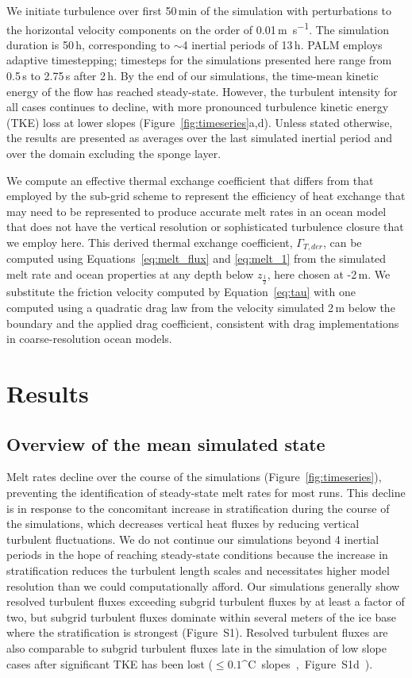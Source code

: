 \documentclass[tc, manuscript]{copernicus}
\begin{document}
We initiate turbulence over first 50\,min of the simulation with perturbations to the horizontal velocity components on the order of 0.01\,\unit{m s^{-1}}. The simulation duration is 50\,\unit{h}, corresponding to $\sim$4 inertial periods of 13\,\unit{h}. PALM employs adaptive timestepping; timesteps for the simulations presented here range from 0.5\,s to 2.75\,s after 2\,\unit{h}. By the end of our simulations, the time-mean kinetic energy of the flow has reached steady-state. However, the turbulent intensity for all cases continues to decline, with more pronounced turbulence kinetic energy (TKE) loss at lower slopes (Figure~\ref{fig:timeseries}a,d). Unless stated otherwise, the results are presented as averages over the last simulated inertial period and over the domain excluding the sponge layer.

We compute an effective thermal exchange coefficient that differs from that employed by the sub-grid scheme to represent the efficiency of heat exchange that may need to be represented to produce accurate melt rates in an ocean model that does not have the vertical resolution or sophisticated turbulence closure that we employ here. This derived thermal exchange coefficient, $\Gamma_{T,der}$, can be computed using Equations~\ref{eq:melt_flux} and \ref{eq:melt_1} from the simulated melt rate and ocean properties at any depth below $z_{\frac{1}{2}}$, here chosen at -2\,\unit{m}. We substitute the friction velocity computed by Equation~\ref{eq:tau} with one computed using a quadratic drag law from the velocity simulated 2\,\unit{m} below the boundary and the applied drag coefficient, consistent with drag implementations in coarse-resolution ocean models. 


\section{Results}\label{results}

\subsection{Overview of the mean simulated state}
Melt rates decline over the course of the simulations (Figure~\ref{fig:timeseries}), preventing the identification of steady-state melt rates for most runs. This decline is in response to the concomitant increase in stratification during the course of the simulations, which decreases vertical heat fluxes by reducing vertical turbulent fluctuations. We do not continue our simulations beyond 4 inertial periods in the hope of reaching steady-state conditions because the increase in stratification reduces the turbulent length scales and necessitates higher model resolution than we could computationally afford. Our simulations generally show resolved turbulent fluxes exceeding subgrid turbulent fluxes by at least a factor of two, but subgrid turbulent fluxes dominate within several meters of the ice base where the stratification is strongest (Figure~S1). Resolved turbulent fluxes are also comparable to subgrid turbulent fluxes late in the simulation of low slope cases after significant TKE has been lost ($\leq\!0.1$\unit{^{\circ}C} slopes, Figure~S1d).
\end{document}
